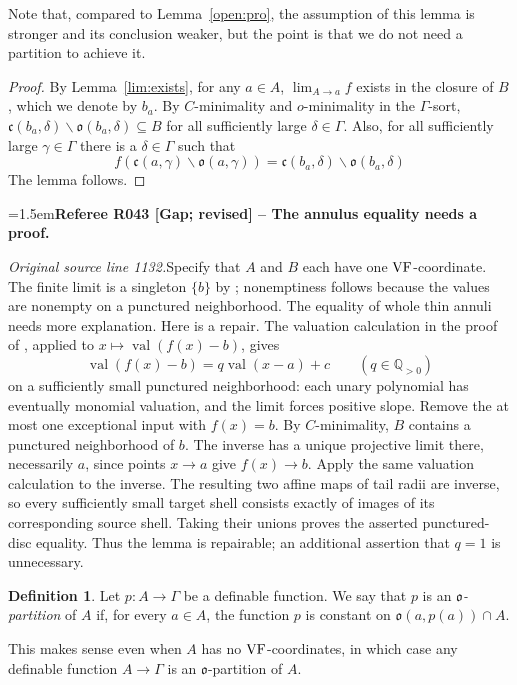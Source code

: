 \documentclass[12pt]{amsart}
\newcommand{\RefereeRemark}[4]{%
  \par\medskip\begingroup\normalfont\small\color{RefereePurple}%
  \emergencystretch=1.5em\noindent\textbf{Referee R#1 [#2] -- #3.}\par\nobreak\noindent #4\par
  \endgroup\medskip
}
\newcommand{\memph}[1]{{\color{magenta}\emph{#1}}}
\theoremstyle{plain}
\theoremstyle{definition}
\newtheorem{defn}[thm]{Definition}
\theoremstyle{remark}
\numberwithin{equation}{section}
\theoremstyle{plain}
\newcommand{\VF}{\textup{VF}}
\newcommand{\omin}{$o$\nobreakdash}
\newcommand{\cmin}{$C$\nobreakdash}
\newcommand{\gc}{\mathfrak{c}}
\newcommand{\go}{\mathfrak{o}}
\newcommand{\0}{\emptyset}
\newcommand{\fun}{\longrightarrow}
\newcommand{\sub}{\subseteq}
\newcommand{\mi}{\smallsetminus}
\DeclareMathOperator{\vv}{val}
\begin{document}
Note that, compared to Lemma~\ref{open:pro}, the assumption of this lemma is stronger and its conclusion weaker, but the point is that we do not need a partition to achieve it.

\begin{proof}
By Lemma~\ref{lim:exists}, for any $a \in A$, $\lim_{ A \rightarrow a} f$ exists in the closure  of $B$, which we denote by $b_a$. By \cmin-minimality and \omin-minimality in the $\Gamma$-sort, $\gc(b_a, \delta) \mi \go(b_a, \delta) \sub B$ for all sufficiently large $\delta \in \Gamma$. Also,  for all sufficiently large $\gamma \in \Gamma$ there is a $\delta \in \Gamma$ such that
\[
f(\gc(a, \gamma) \mi \go(a, \gamma)) = \gc(b_a, \delta) \mi \go(b_a, \delta)
\]
The lemma follows.
\end{proof}

\RefereeRemark{043}{Gap; revised}{The annulus equality needs a proof}{%
\textit{Original source line 1132.}\quad Specify that $A$ and $B$ each have one $\VF$-coordinate. The finite limit is a singleton $\{b\}$ by \cite[Lemma~9.4]{Yin:special:trans}; nonemptiness follows because the values are nonempty on a punctured neighborhood. The equality of whole thin annuli needs more explanation. Here is a repair. The valuation calculation in the proof of \cite[Lemma~8.3]{Yin:special:trans}, applied to $x\mapsto\vv(f(x)-b)$, gives
\[
 \vv(f(x)-b)=q\vv(x-a)+c\qquad(q\in\mathbb Q_{>0})
\]
on a sufficiently small punctured neighborhood: each unary polynomial has eventually monomial valuation, and the limit forces positive slope. Remove the at most one exceptional input with $f(x)=b$. By $C$-minimality, $B$ contains a punctured neighborhood of $b$. The inverse has a unique projective limit there, necessarily $a$, since points $x\to a$ give $f(x)\to b$. Apply the same valuation calculation to the inverse. The resulting two affine maps of tail radii are inverse, so every sufficiently small target shell consists exactly of images of its corresponding source shell. Taking their unions proves the asserted punctured-disc equality. Thus the lemma is repairable; an additional assertion that $q=1$ is unnecessary.
}

\begin{defn}
Let $p : A \fun \Gamma$ be a definable function. We say that $p$ is an \memph{$\go$-partition} of $A$ if, for every $a \in A$, the function $p$ is constant on $\go(a, p(a)) \cap A$.
\end{defn}


This makes sense even when $A$ has no $\VF$-coordinates, in which case any definable function $A \fun \Gamma$ is an $\go$-partition of $A$.
\end{document}
